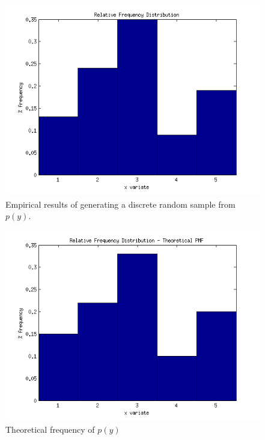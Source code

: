 \documentclass[12pt,a4paper]{article}
\begin{document}
\begin{figure}[ht!]
\begin{center}
\includegraphics[scale=.80]{q4pt9_hist.png}
\caption{Empirical results of generating a discrete random sample from $p(y)$.}
\label{q4pt9fig2}
\end{center}
\end{figure}
\FloatBarrier

\begin{figure}[ht!]
\begin{center}
\includegraphics[scale=.80]{q4pt9_TheoreticalHist.png}
\caption{Theoretical frequency of $p(y)$}
\label{q4pt9fig3}
\end{center}
\end{figure}
\FloatBarrier
\end{document}
